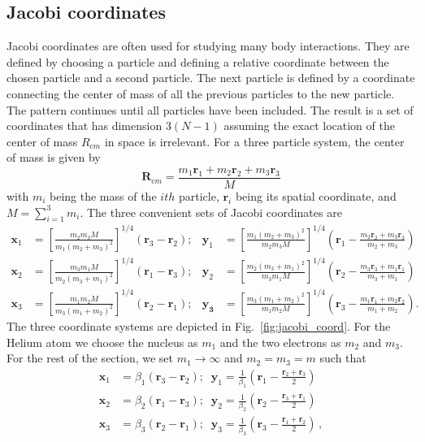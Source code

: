 \subsection{Jacobi coordinates} %
\label{sub:jacobi_coordinates}
Jacobi coordinates are often used for studying many body interactions. They are defined by choosing a particle and defining a relative coordinate between the chosen particle and a second particle. The next particle is defined by a coordinate connecting the center of mass of all the previous particles to the new particle. The pattern continues until all particles have been included. The result is a set of coordinates that has dimension $3(N-1)$ assuming the exact location of the center of mass $R_{cm}$ in space is irrelevant. 
For a three particle system, the center of mass is given by
\begin{equation}
\mathbf{R}_{cm} = \frac{m_1 \mathbf{r}_1 + m_2 \mathbf{r}_2 + m_3 \mathbf{r}_3}{M}
\end{equation}
with $m_i$ being the mass of the $ith$ particle, $\mathbf{r}_i$ being its spatial coordinate, and $M = \sum_{i=1}^3m_i$.
The three convenient sets of Jacobi coordinates are
\begin{align}
\label{eq:jacobi_coords}
\mathbf{x}_1 &= \left[\frac{m_2m_3M}{m_1(m_2+m_3)^2}\right]^{1/4} (\mathbf{r}_3-\mathbf{r}_2); &\mathbf{y}_1 &= \left[\frac{m_1(m_2+m_3)^2}{m_2m_3M}\right]^{1/4} \left(\mathbf{r}_1- \frac{m_2\mathbf{r}_2+m_3\mathbf{r}_3}{m_2+m_3} \right)\\
\mathbf{x}_2 &= \left[\frac{m_3m_1M}{m_2(m_3+m_1)^2}\right]^{1/4} (\mathbf{r}_1-\mathbf{r}_3); &\mathbf{y}_2 &= \left[\frac{m_2(m_3+m_1)^2}{m_3m_1M}\right]^{1/4} \left(\mathbf{r}_2- \frac{m_3\mathbf{r}_3+m_1\mathbf{r}_1}{m_3+m_1} \right)\\
\mathbf{x}_3 &= \left[\frac{m_1m_2M}{m_3(m_1+m_2)^2}\right]^{1/4} (\mathbf{r}_2-\mathbf{r}_1); &\mathbf{y_3} &= \left[\frac{m_3(m_1+m_2)^2}{m_1m_2M}\right]^{1/4} \left(\mathbf{r}_3- \frac{m_1\mathbf{r}_1+m_2\mathbf{r}_2}{m_1+m_2} \right).
\end{align}
The three coordinate systems are depicted in Fig.~\ref{fig:jacobi_coord}. For the Helium atom we choose the nucleus as $m_1$ and the two electrons as $m_2$ and $m_3$. For the rest of the section, we set $m_1\rightarrow \infty$ and $m_2=m_3=m$ such that
\begin{align}
\mathbf{x}_1 &= \beta_1 (\mathbf{r}_3-\mathbf{r}_2); \; \; \mathbf{y}_1 = \frac{1}{\beta_1} \left(\mathbf{r}_1- \frac{\mathbf{r}_2+\mathbf{r}_3}{2} \right)\\
\mathbf{x}_2 &= \beta_2 (\mathbf{r}_1-\mathbf{r}_3); \; \; \mathbf{y}_2 = \frac{1}{\beta_2} \left(\mathbf{r}_2- \frac{\mathbf{r}_3+\mathbf{r}_1}{2} \right)\\
\mathbf{x}_3 &= \beta_3 (\mathbf{r}_2-\mathbf{r}_1); \; \; \mathbf{y}_3 = \frac{1}{\beta_3} \left(\mathbf{r}_3- \frac{\mathbf{r}_1+\mathbf{r}_2}{2} \right)\, ,
\end{align}
